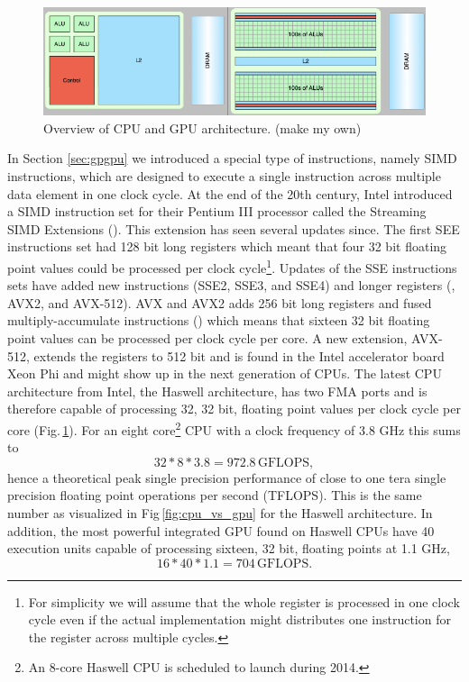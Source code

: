 \begin{figure}
\centering
\includegraphics[width=\textwidth]{img/CPU-GPU.png}
\caption{Overview of CPU and GPU architecture. (make my own)}
\label{fig:cpu_gpu}
\end{figure}

In Section \ref{sec:gpgpu} we introduced a special type of instructions, namely SIMD instructions, which are designed to execute a single instruction across multiple data element in one clock cycle. At the end of the 20th century, Intel introduced a SIMD instruction set for their Pentium III processor called the Streaming SIMD Extensions (). This extension has seen several updates since. The first SEE instructions set had 128 bit long registers which meant that four 32 bit floating point values could be processed per clock cycle\footnote{For simplicity we will assume that the whole register is processed in one clock cycle even if the actual implementation might distributes one instruction for the register across multiple cycles.}. Updates of the SSE instructions sets have added new instructions (SSE2, SSE3, and SSE4) and longer registers (, AVX2, and AVX-512). AVX and AVX2 adds 256 bit long registers and fused multiply-accumulate instructions ()  which means that sixteen 32 bit floating point values can be processed per clock cycle per core. A new extension, AVX-512, extends the registers to 512 bit and is found in the Intel accelerator board  Xeon Phi and might show up in the next generation of CPUs. The latest CPU architecture from Intel, the Haswell architecture, has two FMA ports and is therefore capable of processing 32, 32 bit, floating point values per clock cycle per core (Fig.\,\ref{fig:cpu_gpu}). For an eight core\footnote{An 8-core Haswell CPU is scheduled to launch during 2014.} CPU with a clock frequency of 3.8 GHz this sums to 
\begin{equation}
32*8*3.8 = 972.8\,\text{GFLOPS},
\end{equation}
hence a theoretical peak single precision performance of close to one tera single precision floating point operations per second (TFLOPS). This is the same number as visualized in Fig\,\ref{fig:cpu_vs_gpu} for the Haswell architecture. In addition, the most powerful integrated GPU found on Haswell CPUs have 40 execution units capable of processing sixteen, 32 bit, floating points at 1.1 GHz, 
\begin{equation}
16*40*1.1 = 704\,\text{GFLOPS}.
\end{equation}

